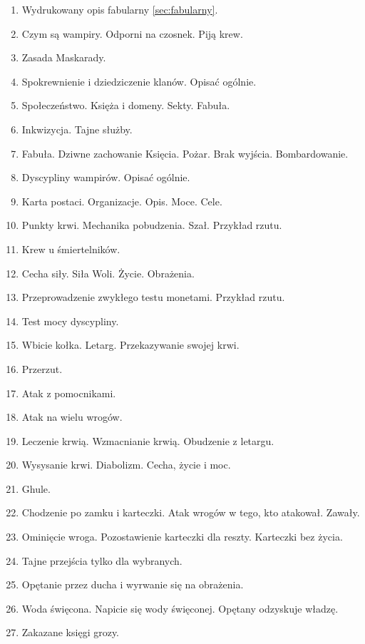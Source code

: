 	\begin{enumerate}
		\item Wydrukowany opis fabularny \ref{sec:fabularny}.
		\item Czym są wampiry. Odporni na czosnek. Piją krew.
		\item Zasada Maskarady.
		\item Spokrewnienie i dziedziczenie klanów. Opisać ogólnie.
		\item Społeczeństwo. Księża i domeny. Sekty. Fabuła.
		\item Inkwizycja. Tajne służby.
		\item Fabuła. Dziwne zachowanie Księcia. Pożar. Brak wyjścia. Bombardowanie.
		\item Dyscypliny wampirów. Opisać ogólnie.
		\item Karta postaci. Organizacje. Opis. Moce. Cele.
		\item Punkty krwi. Mechanika pobudzenia. Szał. Przykład rzutu.
		\item Krew u śmiertelników.
		\item Cecha siły. Siła Woli. Życie. Obrażenia.
		\item Przeprowadzenie zwykłego testu monetami. Przykład rzutu.
		\item Test mocy dyscypliny.
		\item Wbicie kołka. Letarg. Przekazywanie swojej krwi.
		\item Przerzut.
		\item Atak z pomocnikami.
		\item Atak na wielu wrogów.
		\item Leczenie krwią. Wzmacnianie krwią. Obudzenie z letargu.
		\item Wysysanie krwi. Diabolizm. Cecha, życie i moc.
		\item Ghule.
		\item Chodzenie po zamku i karteczki. Atak wrogów w tego, kto atakował. Zawały.
		\item Ominięcie wroga. Pozostawienie karteczki dla reszty. Karteczki bez życia.
		\item Tajne przejścia tylko dla wybranych.
		\item Opętanie przez ducha i wyrwanie się na obrażenia.
		\item Woda święcona. Napicie się wody święconej. Opętany odzyskuje władzę.
		\item Zakazane księgi grozy.
	\end{enumerate}

		

